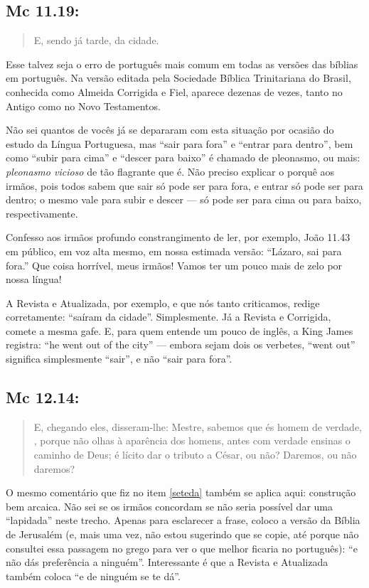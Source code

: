\subsection{Mc 11.19:}\label{saiu}
\begin{quote}
    \small
E, sendo já tarde,  da cidade.
\end{quote}

Esse talvez seja o erro de português mais comum em todas as versões das bíblias em português. Na versão editada pela Sociedade Bíblica Trinitariana do Brasil, conhecida como Almeida Corrigida e Fiel, aparece dezenas de vezes, tanto no Antigo como no Novo Testamentos.

Não sei quantos de vocês já se depararam com esta situação por ocasião
do estudo da Língua Portuguesa, mas ``sair para fora'' e ``entrar para
dentro'', bem como ``subir para cima'' e ``descer para baixo'' é
chamado de pleonasmo, ou mais: \emph{pleonasmo vicioso} de tão flagrante que
é. Não preciso explicar o porquê aos irmãos, pois todos sabem que sair
só pode ser para fora, e entrar só pode ser para dentro; o mesmo vale
para subir e descer --- só pode ser para cima ou para baixo,
respectivamente.

Confesso aos irmãos profundo constrangimento de ler, por exemplo,
João 11.43 em público, em voz alta mesmo, em nossa estimada versão:
``Lázaro, sai para fora.'' Que coisa horrível, meus irmãos! Vamos ter
um pouco mais de zelo por nossa língua!

A Revista e Atualizada, por exemplo, e que nós tanto criticamos,
redige corretamente: ``saíram da cidade''. Simplesmente. Já a Revista
e Corrigida, comete a mesma gafe. E, para quem entende um pouco de
inglês, a King James registra: ``he went out of the city'' --- embora
sejam dois os verbetes, ``went out'' significa simplesmente ``sair'',
e não ``sair para fora''.

\subsection{Mc 12.14:}
\begin{quote}
    \small
E, chegando eles, disseram-lhe:
 Mestre, sabemos que és homem de verdade, , porque não olhas à aparência dos homens, antes com verdade
 ensinas o caminho de Deus; é lícito dar o tributo a César, ou não?
 Daremos, ou não daremos?
\end{quote}

O mesmo comentário que fiz no item \ref{seteda}  também se aplica aqui:
construção bem arcaica. Não sei se os irmãos concordam se não seria
possível dar uma ``lapidada'' neste trecho. Apenas para esclarecer a
frase, coloco a versão da Bíblia de Jerusalém (e, mais uma vez, não
estou sugerindo que se copie, até porque não consultei essa passagem
no grego para ver o que melhor ficaria no português): ``e não dás
preferência a ninguém''. Interessante é que a Revista e Atualizada também coloca ``e de ninguém se te dá''.

